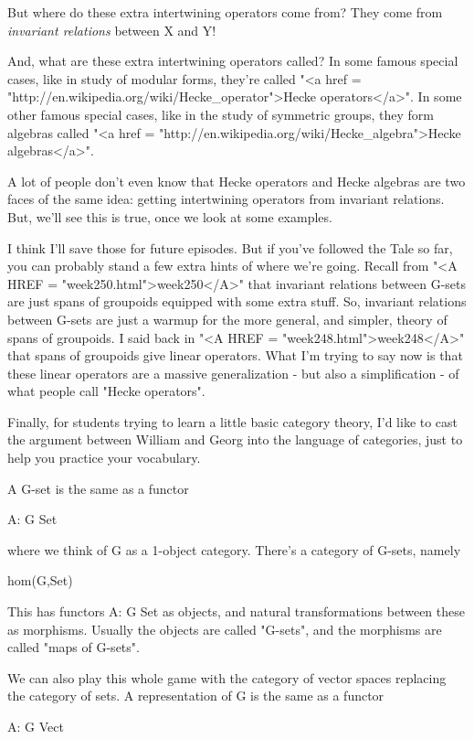 But where do these extra intertwining operators come from?  They come
from \emph{invariant relations} between X and Y!  

And, what are these extra intertwining operators called?  In some
famous special cases, like in study of modular forms, they're called
"<a href = "http://en.wikipedia.org/wiki/Hecke_operator">Hecke 
operators</a>".  In some other famous special cases,
like in the study of symmetric groups, they form algebras called
"<a href = "http://en.wikipedia.org/wiki/Hecke_algebra">Hecke 
algebras</a>".  

A lot of people don't even know that 
Hecke operators and Hecke algebras are two faces of the same idea:
getting intertwining operators from invariant relations.  
But, we'll see this is true, once we look at some examples.

I think I'll save those for future episodes.  
But if you've followed the Tale so
far, you can probably stand a few extra hints of where we're going.
Recall from "<A HREF = "week250.html">week250</A>" that
invariant relations between G-sets are just spans of groupoids
equipped with some extra stuff.  So, invariant relations between
G-sets are just a warmup for the more general, and simpler, theory of
spans of groupoids.  I said back in "<A HREF =
"week248.html">week248</A>" that spans of groupoids give linear
operators.  What I'm trying to say now is that these linear operators
are a massive generalization - but also a simplification - of what
people call "Hecke operators".

Finally, for students trying to learn a little basic category theory, I'd
like to cast the argument between William and Georg into the language of 
categories, just to help you practice your vocabulary.

A G-set is the same as a functor

A: G \to  Set

where we think of G as a 1-object category.  There's a category of 
G-sets, namely

hom(G,Set)

This has functors A: G \to  Set as objects, and natural transformations
between these as morphisms.  Usually the objects are called "G-sets",
and the morphisms are called "maps of G-sets".  

We can also play this whole game with the category of vector spaces 
replacing the category of sets.  A representation of G is the same as
a functor

A: G \to  Vect

